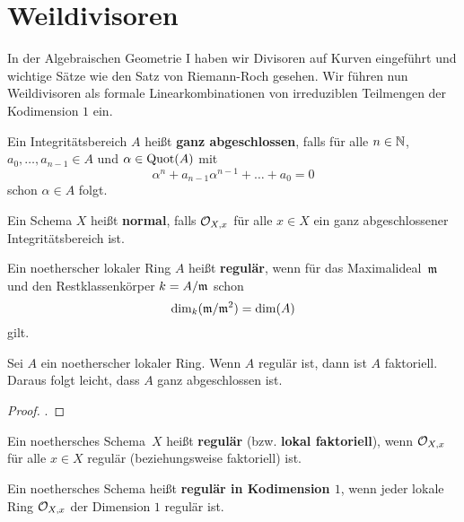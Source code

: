 
\chapter{Weildivisoren}

In der Algebraischen Geometrie I haben wir Divisoren auf Kurven eingeführt und wichtige Sätze wie den Satz von Riemann-Roch gesehen. Wir führen nun Weildivisoren als formale Linearkombinationen von irreduziblen Teilmengen der Kodimension $1$ ein.

\begin{eri}
\label{eri:12.1}
	Ein Integritätsbereich $A$ heißt \textbf{ganz abgeschlossen}, falls für alle $n \in \mathbb {N}$, $a_0,\ldots,a_{n-1} \in A$ und $\alpha\in \operatorname{Quot}(A)$ mit
	\[
		\alpha^n+a_{n-1}\alpha^{n-1}+\ldots+a_0 = 0
	\]
	schon $\alpha \in A$ folgt.
\end{eri}

\begin{defn}
\label{defn:12.2}
	Ein Schema $X$ heißt \textbf{normal}, falls $\mathcal{O}_{X,x}$ für alle $x\in X$ ein ganz abgeschlossener Integritätsbereich ist.
\end{defn}

\begin{defn}
\label{defn:12.3}
	Ein noetherscher lokaler Ring $A$ heißt \textbf{regulär}, wenn für das Maximalideal~$\mathfrak{m}$ und den Restklassenkörper $k = A/\mathfrak{m}$ schon
	\[
		\dim_k(\mathfrak{m}/\mathfrak{m}^2) = \dim(A)
	\]
	gilt.
\end{defn}

\begin{bem}
\label{bem:12.4}
	Sei $A$ ein noetherscher lokaler Ring. Wenn $A$ regulär ist, dann ist $A$ faktoriell. Daraus folgt leicht, dass $A$ ganz abgeschlossen ist.
	\begin{proof}
		\cite[78]{matsumura1970commutative}.
	\end{proof}
\end{bem}

\begin{defn}
\label{defn:12.5}
	Ein noethersches Schema~$X$ heißt \textbf{regulär} (bzw. \textbf{lokal faktoriell}), wenn $\mathcal{O}_{X,x}$ für alle $x \in X$ regulär (beziehungsweise faktoriell) ist.
\end{defn}

\begin{defn}
\label{defn:12.6}
	Ein noethersches Schema heißt \textbf{regulär in Kodimension $1$}, wenn jeder lokale Ring $\mathcal{O}_{X,x}$ der Dimension $1$ regulär ist.
\end{defn}


